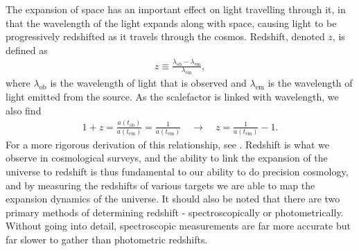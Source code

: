 \documentclass[titlesmallcaps, examinerscopy, copyrightpage]{uqthesis}
\begin{document}
The expansion of space has an important effect on light travelling through it, in that the wavelength of the light expands along with space, causing light to be progressively redshifted as it travels through the cosmos. Redshift, denoted $z$, is defined as 
\begin{align}
z \equiv \frac{\lambda_{\text{ob}} - \lambda_{\text{em}}}{\lambda_{\text{em}}},
\end{align}
where $\lambda_{\text{ob}}$ is the wavelength of light that is observed and $\lambda_{\text{em}}$ is the wavelength of light emitted from the source. As the scalefactor is linked with wavelength, we also find
\begin{align}
1 + z = \frac{a(t_{\text{ob}})}{a(t_{\text{em}})} = \frac{1}{a(t_{\text{em}})} \quad\rightarrow \quad z = \frac{1}{a(t_{\text{em}})} - 1.
\end{align}
For a more rigorous derivation of this relationship, see \citet[Ch 3.4]{RydenPartridge2004}. Redshift is what we observe in cosmological surveys, and the ability to link the expansion of the universe to redshift is thus fundamental to our ability to do precision cosmology, and by measuring the redshifts of various targets we are able to map the expansion dynamics of the universe. It should also be noted that there are two primary methods of determining redshift - spectroscopically or photometrically. Without going into detail, spectroscopic measurements are far more accurate but far slower to gather than photometric redshifts.
\end{document}
